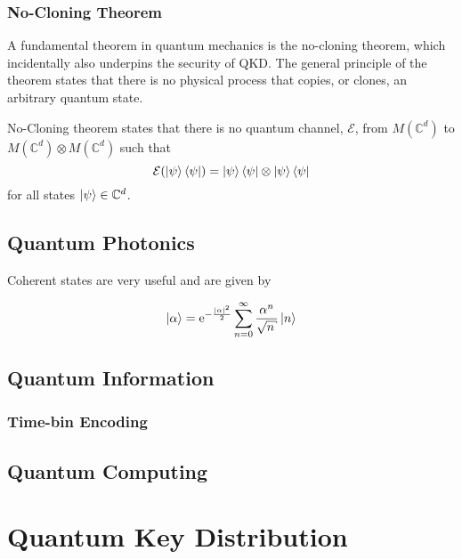 \subsubsection{No-Cloning Theorem}

A fundamental theorem in quantum mechanics is the {\color{bristol-red} no-cloning theorem}, which incidentally also underpins the security of \ac{QKD}. The general principle of the theorem states that there is no physical process that copies, or clones, an arbitrary quantum state.

\begin{theo}
	 No-Cloning theorem states that there is no quantum channel, $\mathcal{E}$, from $M(\mathbb{C}^d)$ to $M(\mathbb{C}^d) \otimes M(\mathbb{C}^d)$ such that
	 \begin{equation}
	 	\mathcal{E}(\ket{\psi}\bra{\psi}) = \ket{\psi}\bra{\psi} \otimes \ket{\psi}\bra{\psi}
	 \end{equation}
	 for all states $\ket{\psi} \in \mathbb{C}^d$.
\end{theo}


\subsection{Quantum Photonics}


Coherent states are very useful and are given by

\begin{equation}
	\ket{\alpha} = \mathrm{e}^{-\frac{|\alpha|^2}{2}} \sum_{n=0}^\infty \frac{\alpha^n}{\sqrt{n}} \ket{n} 
\end{equation}


\subsection{Quantum Information}



\subsubsection{Time-bin Encoding}



\subsection{Quantum Computing}



\section{Quantum Key Distribution}

